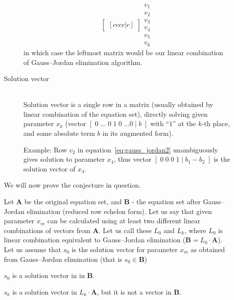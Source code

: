 \begin{description}
\begin{description}
\begin{equation}
\begin{bmatrix}[cccc|c]
            \end{bmatrix}
            \begin{matrix}
            v_1 \\ v_2 \\ v_3 \\ v_4 \\ v_5 \\ v_6
            \end{matrix}
            \label{eq:gauss_jordan2}
            \end{equation}
            in which case the leftmost matrix would be our linear combination of Gauss--Jordan elimination algorithm.

        \item[Solution vector] \hfill \\
            Solution vector is a single row in a matrix (usually obtained by linear combination of the equation set), directly solving given parameter $x_k$ (vector $[\;0 \;\ldots\;0\;1\;0\; \ldots 0 \;|\; b\;]$ with ``$1$'' at the $k$-th place, and some absolute term $b$ in its augmented form).

            Example:
            Row $v_2$ in equation~\ref{eq:gauss_jordan2} unambiguously gives solution to parameter $x_4$, thus vector $[\;0\;0\;0\;1\;|\;b_1 - b_2\;]$ is the solution vector of $x_4$.
    \end{description}

    We will now prove the conjecture in question. 

    Let $\boldsymbol{A}$ be the original equation set, and $\boldsymbol{B}$ - the equation set after Gauss--Jordan elimination (reduced row echelon form).
    Let us say that given parameter $x_m$ can be calculated using at least two different linear combinations of vectors from $\boldsymbol{A}$.
    Let us call these $L_0$ and $L_k$, where $L_0$ is linear combination equivalent to Gauss--Jordan elimination ($\boldsymbol{B} = L_0 \cdot \boldsymbol{A}$).
    Let us assume that $s_0$ is the solution vector for parameter $x_m$ as obtained from Gauss--Jordan elimination (that is $s_0 \in \boldsymbol{B}$)

    $s_0$ is a solution vector in in $\boldsymbol{B}$.

    $s_k$ is a solution vector in $L_k \cdot \boldsymbol{A}$, but it is not a vector in $\boldsymbol{B}$.


\end{description}
